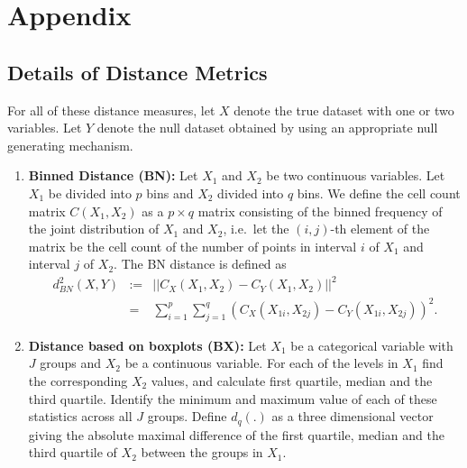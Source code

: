 \documentclass[12pt]{article}\usepackage[]{graphicx}\usepackage[]{color}
\begin{document}



\newpage
\section*{Appendix}

\subsection*{Details of Distance Metrics}\label{sec:distmetdetails}

For all of these distance measures, let $X$ denote the true dataset with one or two variables. Let $Y$ denote the null dataset obtained by using an appropriate null generating mechanism.


\begin{enumerate}

\item {\bf Binned Distance (BN):}
Let $X_1$ and $X_2$ be two continuous variables. Let $X_1$ be divided into $p$ bins and $X_2$ divided into $q$ bins. %
 We define the cell count matrix $C(X_1,X_2)$  as a $p \times q$ matrix consisting of the binned frequency of the joint distribution of $X_1$ and $X_2$, i.e.\ let the $(i,j)$-th element of the matrix be the cell count of the number of points in interval $i$ of $X_1$ and interval $j$ of $X_2$.
The BN distance is defined as
\begin{eqnarray}\nonumber
d_{BN}^2 (X, Y) &:=& ||C_X(X_1, X_2) - C_Y(X_1,X_2)||^2 \\ &=& \sum_{i=1}^p \sum_{j=1}^q (C_X(X_{1i},X_{2j}) - C_Y(X_{1i},X_{2j}))^2.\label{eq:BNdist}
\end{eqnarray}



\item {\bf Distance based on boxplots (BX):} 
Let $X_1$ be a categorical variable with $J$ groups  and $X_2$ be a continuous variable. 
For each of the levels in $X_1$ find the corresponding $X_2$ values, and calculate first quartile, median and the third quartile. Identify the minimum and maximum value of each of these statistics across all $J$ groups.
Define $d_q(.)$ as a three dimensional vector giving the absolute maximal difference of the first quartile, median and the third quartile of $X_2$ between the groups in $X_1$. 


\end{enumerate}
\end{document}
